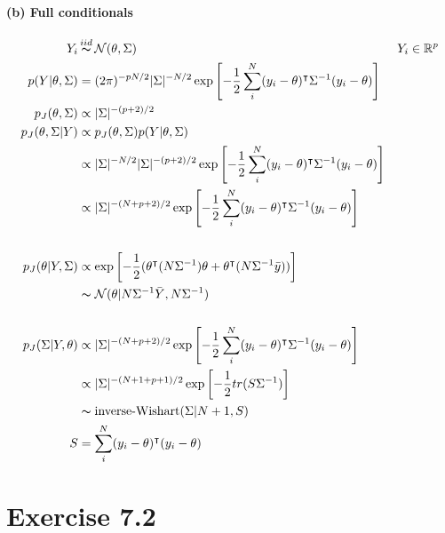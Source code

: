 \documentclass[11pt, letterpaper]{article}
\begin{document}
\paragraph{(b) Full conditionals}
\begin{align*}
    Y_i &\mathop{\thicksim}^{iid} \mathcal{N}(\theta, \Sigma) && Y_i \in \mathbb{R}^p \\
    p(Y|\theta, \Sigma) &=
        (2\pi)^{-pN/2} |\Sigma|^{-N/2} 
        \exp \left[ -\frac{1}{2} \sum_i^N (y_i-\theta)^{\intercal} \Sigma^{-1} (y_i-\theta) \right] \\
    p_J(\theta, \Sigma) &\propto |\Sigma|^{-(p+2)/2} \\
    p_J(\theta, \Sigma|Y) &\propto p_J(\theta, \Sigma) p(Y|\theta, \Sigma) \\
        &\propto |\Sigma|^{-N/2} |\Sigma|^{-(p+2)/2}
            \exp \left[ -\frac{1}{2} \sum_i^N (y_i-\theta)^{\intercal} \Sigma^{-1} (y_i-\theta) \right] \\
        &\propto |\Sigma|^{-(N+p+2)/2} 
            \exp \left[ -\frac{1}{2} \sum_i^N (y_i-\theta)^{\intercal} \Sigma^{-1} (y_i-\theta) \right] \\ \\
    p_J(\theta|Y, \Sigma) &\propto \exp \left[
            -\frac{1}{2} (\theta^{\intercal}(N\Sigma^{-1})\theta
            + \theta^{\intercal}(N\Sigma^{-1} \bar{y}))
        \right] \\
        &\thicksim \mathcal{N}(\theta|N\Sigma^{-1} \bar{Y}, N\Sigma^{-1}) \\ \\
    p_J(\Sigma|Y, \theta) &\propto |\Sigma|^{-(N+p+2)/2} 
            \exp \left[ -\frac{1}{2} \sum_i^N (y_i-\theta)^{\intercal} \Sigma^{-1} (y_i-\theta) \right] \\
        &\propto |\Sigma|^{-(N+1+p+1)/2} \exp \left[ -\frac{1}{2} tr(S \Sigma^{-1}) \right] \\
        &\thicksim \text{inverse-Wishart}(\Sigma | N+1, S) \\
    S &= \sum_i^N (y_i - \theta)^{\intercal} (y_i - \theta)
\end{align*}

\newpage
\section{Exercise 7.2}
\end{document}
